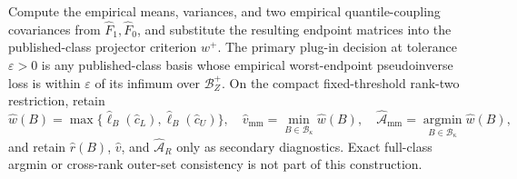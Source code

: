 Compute the empirical means, variances, and two empirical quantile-coupling covariances from \(\widehat F_1,\widehat F_0\), and substitute the resulting endpoint matrices into the published-class projector criterion \(w^+\).  The primary plug-in decision at tolerance \(\varepsilon>0\) is any published-class basis whose empirical worst-endpoint pseudoinverse loss is within \(\varepsilon\) of its infimum over \(\mathcal B_Z^+\).  On the compact fixed-threshold rank-two restriction, retain
\[
\widehat w(B)=\max\{\widehat\ell_B(\widehat c_L),\widehat\ell_B(\widehat c_U)\},
\quad
\widehat v_{\mathrm{mm}}=\min_{B\in\mathcal B_\kappa}\widehat w(B),
\quad
\widehat{\mathcal A}_{\mathrm{mm}}=\operatorname*{argmin}_{B\in\mathcal B_\kappa}\widehat w(B),
\]
and retain \(\widehat r(B)\), \(\widehat v\), and \(\widehat{\mathcal A}_R\) only as secondary diagnostics.  Exact full-class argmin or cross-rank outer-set consistency is not part of this construction.